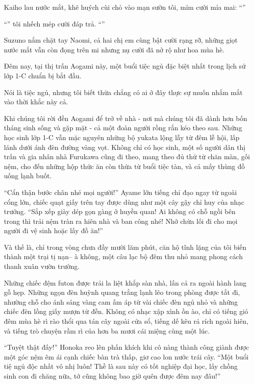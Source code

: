 \documentclass[../main.tex]{subfiles}
\begin{document}
Kaiho lau nước mắt, khẽ huých cùi chỏ vào mạn sườn tôi, mỉm cười mỉa mai: ``''

``'' tôi nhếch mép cười đáp trả. ``''

Suzuno nắm chặt tay Naomi, cả hai chị em cùng bật cười rạng rỡ, những giọt nước mắt vẫn còn đọng trên mi nhưng nụ cười đã nở rộ như hoa mùa hè.

Đêm nay, tại thị trấn Aogami này, một buổi tiệc ngủ đặc biệt nhất trong lịch sử lớp 1-C chuẩn bị bắt đầu.

\ct

Nói là tiệc ngủ, nhưng tôi biết thừa chẳng có ai ở đây thực sự muốn nhắm mắt vào thời khắc này cả.

Khi chúng tôi rời đền Aogami để trở về nhà - nơi mà chúng tôi đã dành hơn bốn tháng sinh sống và gặp mặt - cả một đoàn người rồng rắn kéo theo sau. Những học sinh lớp 1-C vẫn mặc nguyên những bộ yukata lộng lẫy từ đêm lễ hội, lấp lánh dưới ánh đèn đường vàng vọt. Không chỉ có học sinh, một số người dân thị trấn và gia nhân nhà Furukawa cũng đi theo, mang theo đủ thứ từ chăn màn, gối nệm, cho đến những hộp thức ăn còn thừa từ buổi tiệc tàn, và cả mấy thùng đồ uống lạnh buốt.

``Cẩn thận bước chân nhé mọi người!'' Ayame lớn tiếng chỉ đạo ngay từ ngoài cổng lớn, chiếc quạt giấy trên tay được dùng như một cây gậy chỉ huy của nhạc trưởng. ``Sắp xếp giày dép gọn gàng ở huyền quan! Ai không có chỗ ngồi bên trong thì trải nệm tràn ra hiên nhà và ban công nhé! Nhớ chừa lối đi cho mọi người đi vệ sinh hoặc lấy đồ ăn!''

Và thế là, chỉ trong vòng chưa đầy mười lăm phút, căn hộ tĩnh lặng của tôi biến thành một trại tị nạn-- à không, một câu lạc bộ đêm thu nhỏ mang phong cách thanh xuân vườn trường.

Những chiếc đệm futon được trải la liệt khắp sàn nhà, lấn cả ra ngoài hành lang gỗ hẹp. Những ngọn đèn huỳnh quang trắng lạnh lẽo trong phòng được tắt đi, nhường chỗ cho ánh sáng vàng cam ấm áp từ vài chiếc đèn ngủ nhỏ và những chiếc đèn lồng giấy mượn từ đền. Không có nhạc xập xình ồn ào, chỉ có tiếng gió đêm mùa hè rì rào thổi qua tán cây ngoài cửa sổ, tiếng dế kêu rả rích ngoài hiên, và tiếng trò chuyện rầm rì của hơn ba mươi cái miệng cùng một lúc.

``Tuyệt thật đấy!'' Honoka reo lên phấn khích khi cô nàng thành công giành được một góc nệm êm ái cạnh chiếc bàn trà thấp, giơ cao lon nước trái cây. ``Một buổi tiệ ngủ độc nhất vô nhị luôn! Thề là sau này có tốt nghiệp đại học, lấy chồng sinh con đi chăng nữa, tớ cũng không bao giờ quên được đêm nay đâu!''
\end{document}
